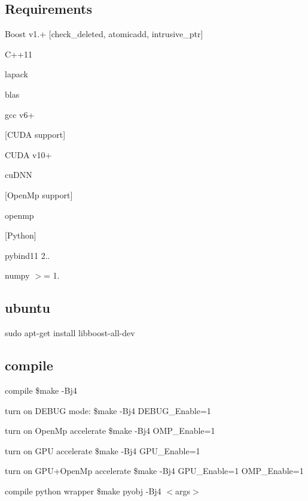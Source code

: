 \subsection*{Requirements}


\begin{DoxyItemize}
\item Boost v1.+ \mbox{[}check\+\_\+deleted, atomicadd, intrusive\+\_\+ptr\mbox{]}
\item C++11
\item lapack
\item blas
\item gcc v6+
\end{DoxyItemize}

\mbox{[}C\+U\+DA support\mbox{]}
\begin{DoxyItemize}
\item C\+U\+DA v10+
\item cu\+D\+NN
\end{DoxyItemize}

\mbox{[}Open\+Mp support\mbox{]}
\begin{DoxyItemize}
\item openmp
\end{DoxyItemize}

\mbox{[}Python\mbox{]}
\begin{DoxyItemize}
\item pybind11 2..
\item numpy $>$= 1.
\end{DoxyItemize}

\subsection*{ubuntu}

sudo apt-\/get install libboost-\/all-\/dev

\subsection*{compile}


\begin{DoxyItemize}
\item compile \$make -\/\+Bj4
\item turn on D\+E\+B\+UG mode\+: \$make -\/\+Bj4 D\+E\+B\+U\+G\+\_\+\+Enable=1
\item turn on Open\+Mp accelerate \$make -\/\+Bj4 O\+M\+P\+\_\+\+Enable=1
\item turn on G\+PU accelerate \$make -\/\+Bj4 G\+P\+U\+\_\+\+Enable=1
\item turn on G\+P\+U+\+Open\+Mp accelerate \$make -\/\+Bj4 G\+P\+U\+\_\+\+Enable=1 O\+M\+P\+\_\+\+Enable=1
\item compile python wrapper \$make pyobj -\/\+Bj4 $<$args$>$
\end{DoxyItemize}

